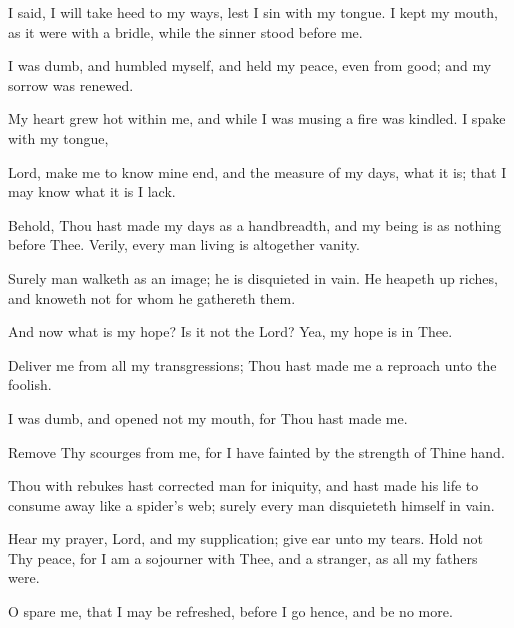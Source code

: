 I said, I will take heed to my ways, lest I sin with my tongue. I kept my mouth, as it were with a bridle, while the sinner stood
before me.

I was dumb, and humbled myself, and held my peace, even from good; and my sorrow was renewed.

My heart grew hot within me, and while I was musing a fire was kindled. I spake with my tongue,

Lord, make me to know mine end, and the measure of my days, what it is; that I may know what it is I lack.

Behold, Thou hast made my days as a handbreadth, and my being is as nothing before Thee. Verily, every man living is altogether vanity.

Surely man walketh as an image; he is disquieted in vain. He heapeth up riches, and knoweth not for whom he gathereth them.

And now what is my hope? Is it not the Lord? Yea, my hope is
in Thee.

Deliver me from all my transgressions; Thou hast made me a reproach unto the foolish.

I was dumb, and opened not my mouth, for Thou hast made me.

Remove Thy scourges from me, for I have fainted by the strength of Thine hand.

Thou with rebukes hast corrected man for iniquity, and hast made his life to consume away like a spider's web; surely every man disquieteth himself in vain.

Hear my prayer, Lord, and my supplication; give ear unto my tears. Hold not Thy peace, for I am a sojourner with Thee, and a stranger, as all my fathers were.

O spare me, that I may be refreshed, before I go hence, and be no more.

